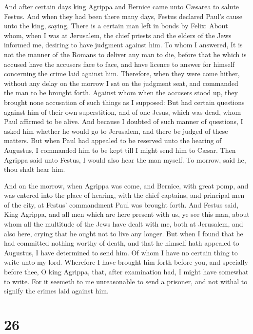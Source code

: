  And after certain days king Agrippa and Bernice came unto
Cæsarea to salute Festus.  And when they had been there
many days, Festus declared Paul's cause unto the king, saying, There is
a certain man left in bonds by Felix:  About whom, when I
was at Jerusalem, the chief priests and the elders of the Jews informed
me, desiring to have judgment against him.  To whom I
answered, It is not the manner of the Romans to deliver any man to die,
before that he which is accused have the accusers face to face, and have
licence to answer for himself concerning the crime laid against him.
 Therefore, when they were come hither, without any delay
on the morrow I sat on the judgment seat, and commanded the man to be
brought forth.  Against whom when the accusers stood up,
they brought none accusation of such things as I supposed: 
But had certain questions against him of their own superstition, and of
one Jesus, which was dead, whom Paul affirmed to be alive. 
And because I doubted of such manner of questions, I asked him whether
he would go to Jerusalem, and there be judged of these matters.
 But when Paul had appealed to be reserved unto the hearing
of Augustus, I commanded him to be kept till I might send him to Cæsar.
 Then Agrippa said unto Festus, I would also hear the man
myself. To morrow, said he, thou shalt hear him.

 And on the morrow, when Agrippa was come, and Bernice,
with great pomp, and was entered into the place of hearing, with the
chief captains, and principal men of the city, at Festus' commandment
Paul was brought forth.  And Festus said, King Agrippa, and
all men which are here present with us, ye see this man, about whom all
the multitude of the Jews have dealt with me, both at Jerusalem, and
also here, crying that he ought not to live any longer. 
But when I found that he had committed nothing worthy of death, and that
he himself hath appealed to Augustus, I have determined to send him.
 Of whom I have no certain thing to write unto my lord.
Wherefore I have brought him forth before you, and specially before
thee, O king Agrippa, that, after examination had, I might have somewhat
to write.  For it seemeth to me unreasonable to send a
prisoner, and not withal to signify the crimes laid against him.

\hypertarget{section-25}{%
\section{26}\label{section-25}}

